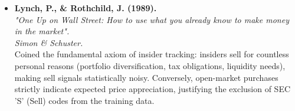 \documentclass{article}
\begin{document}
\begin{itemize}
        \item \textbf{Lynch, P., \& Rothchild, J. (1989).} \\
        \textit{"One Up on Wall Street: How to use what you already know to make money in the market".} \\
        \small \textit{Simon \& Schuster.} \\
        \small Coined the fundamental axiom of insider tracking: insiders sell for countless personal reasons (portfolio diversification, tax obligations, liquidity needs), making sell signals statistically noisy. Conversely, open-market purchases strictly indicate expected price appreciation, justifying the exclusion of SEC 'S' (Sell) codes from the training data.

    \end{itemize}
\end{document}
